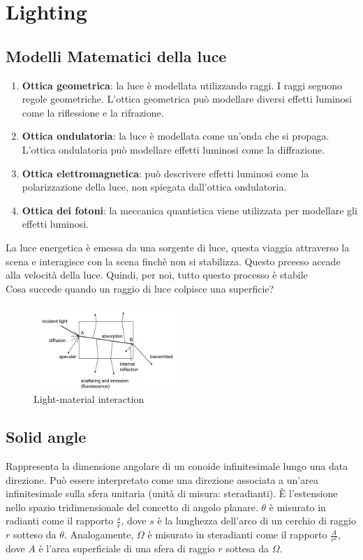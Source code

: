 \section{Lighting}
\subsection{Modelli Matematici della luce}
\begin{enumerate}
    \item \textbf{Ottica geometrica}: la luce è modellata utilizzando raggi. I raggi seguono regole geometriche. L'ottica geometrica può modellare diversi effetti luminosi come la riflessione e la rifrazione.
    
    \item \textbf{Ottica ondulatoria}: la luce è modellata come un'onda che si propaga. L'ottica ondulatoria può modellare effetti luminosi come la diffrazione.
    
    \item \textbf{Ottica elettromagnetica}: può descrivere effetti luminosi come la polarizzazione della luce, non spiegata dall'ottica ondulatoria.
    
    \item \textbf{Ottica dei fotoni}: la meccanica quantistica viene utilizzata per modellare gli effetti luminosi.
\end{enumerate}
La luce energetica è emessa da una sorgente di luce, questa viaggia attraverso la scena e interagisce con la scena finchè non si stabilizza.
Questo prceeso accade alla velocità della luce. Quindi, per noi, tutto questo processo è stabile\\ Cosa succede quando un raggio di luce colpisce una superficie?
\begin{figure}[H]
    \centering
    \includegraphics[width=0.5\textwidth]{images/LightMat.png} 
    \caption{Light-material interaction}
    \label{fig:immagine}
\end{figure}

\subsection{Solid angle}
Rappresenta la dimensione angolare di un conoide infinitesimale lungo una data direzione.
Può essere interpretato come una direzione associata a un'area infinitesimale sulla sfera unitaria (unità di misura: steradianti).
È l'estensione nello spazio tridimensionale del concetto di angolo planare.
$\theta$ è misurato in radianti come il rapporto $\frac{s}{r}$, dove $s$ è la lunghezza dell'arco di un cerchio di raggio $r$ sotteso da $\theta$.
Analogamente, $\Omega$ è misurato in steradianti come il rapporto $\frac{A}{r^2}$, dove $A$ è l'area superficiale di una sfera di raggio $r$ sottesa da $\Omega$.

